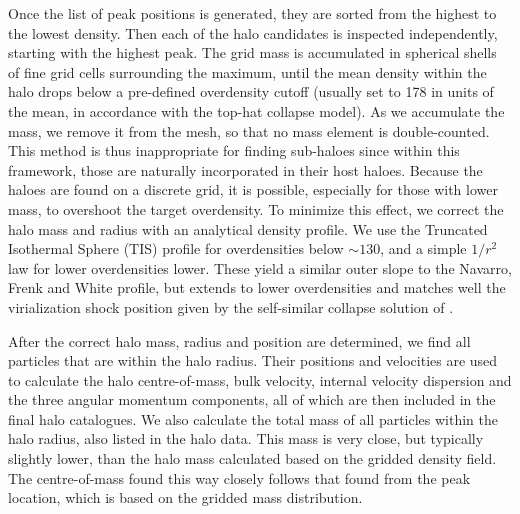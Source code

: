 \documentclass[useAMS,usenatbib]{mn2e}
\begin{document}
Once the list of peak positions is generated, they are sorted from the highest 
to the lowest density. Then each of the halo candidates is inspected 
independently, starting with the highest peak. The grid mass is accumulated 
in spherical shells of fine grid cells surrounding the maximum, until the 
mean density within the halo drops below a pre-defined overdensity cutoff 
(usually set to 178 in units of the mean, in accordance with the top-hat 
collapse model). As we accumulate the mass, we remove it from the mesh, so that no 
mass element is double-counted. This method is thus inappropriate for finding 
sub-haloes since within this framework, those are naturally incorporated in their 
host haloes. Because the haloes are found on a discrete grid, it is 
possible, especially for those with lower mass, to overshoot the target overdensity.
To minimize this effect, we correct the halo mass and radius with an analytical density profile. 
We use the Truncated Isothermal Sphere (TIS) 
profile \citep{1999MNRAS.307..203S,2001MNRAS.325..468I} for overdensities below 
$\sim130$, and a simple $1/r^2$ law for lower overdensities lower. 
These yield a similar outer slope to the Navarro, Frenk and White 
\citep[NFW][]{1997ApJ...490..493N} profile, but extends to lower overdensities
and matches well the virialization shock position given by the
self-similar collapse solution of \citet{1985ApJS...58...39B}.

After the correct halo mass, radius and position are determined, we find all 
particles that are within the halo radius. Their positions and velocities are
used to calculate the halo centre-of-mass, bulk velocity, internal velocity 
dispersion and the three angular momentum components, all of which are then 
included in the final halo catalogues. We also calculate the total mass of
all particles within the halo radius, also listed in the halo data. This mass
is very close, but  typically slightly lower, than the halo mass calculated 
based on the gridded density field. The  centre-of-mass found this way closely follows 
that found from the peak location, which is based on the gridded mass distribution. 

\end{document}
